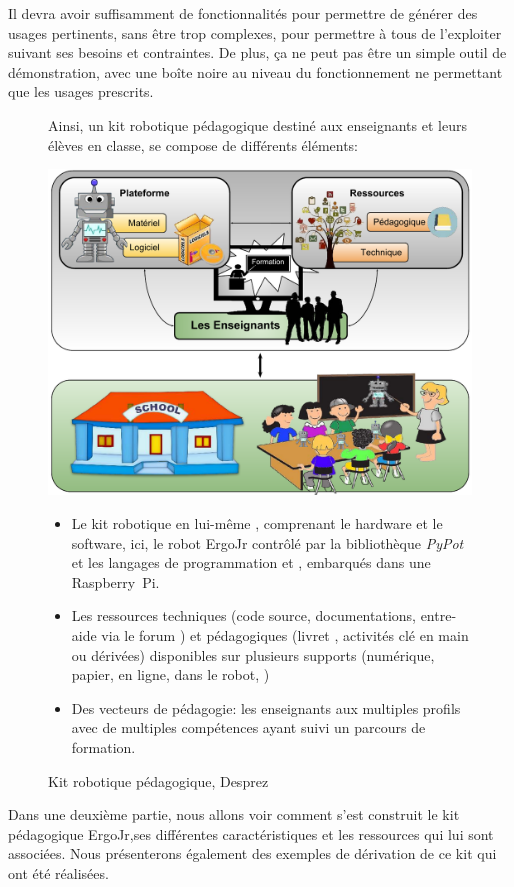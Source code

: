 \begin{concluPart}
Il devra avoir suffisamment de fonctionnalités pour permettre de générer des usages pertinents, sans être trop complexes, pour permettre à tous de l'exploiter suivant ses besoins et contraintes.
De plus, ça ne peut pas être un simple outil de démonstration, avec une boîte noire au niveau du fonctionnement ne permettant que les usages prescrits.\par%
\begin{figure}[!h]
\myDefautStyle
Ainsi, un kit robotique pédagogique destiné aux enseignants et leurs élèves en classe, se compose de différents éléments:\par%
\begin{minipage}{.38\linewidth}
  \centering
  \includegraphics[width=\linewidth]{Figures/Poppy-Kit.pdf}
  \caption{Kit robotique pédagogique, Desprez~\cite{desprezPoster-efran}}\label{fig:poppy_kit}
\end{minipage}
\hfill
\begin{minipage}{.55\linewidth}
\myDefautStyle
\begin{itemize}\myItemStyle
  \item Le kit robotique en lui-même , comprenant le hardware et le software, ici, le robot ErgoJr contrôlé par la bibliothèque \textit{PyPot} et les langages de programmation  et , embarqués dans une Raspberry~Pi.
  \item Les ressources techniques (code source, documentations, entre-aide via le forum \etc) et pédagogiques (livret , activités clé en main ou dérivées) disponibles sur plusieurs supports (numérique, papier, en ligne, dans le robot, \etc)
  \item Des vecteurs de pédagogie: les enseignants aux multiples profils avec de multiples compétences ayant suivi un parcours de formation.
\end{itemize}
\end{minipage}
\end{figure}\par%
Dans une deuxième partie, nous allons voir comment s'est construit le kit pédagogique ErgoJr,ses différentes caractéristiques et les ressources qui lui sont associées. Nous présenterons également des exemples de dérivation de ce kit qui ont été réalisées.
\end{concluPart}